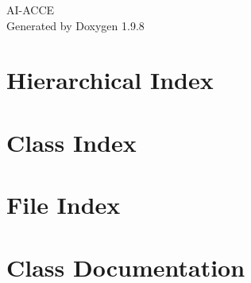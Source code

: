 \documentclass[twoside]{book}
\newcommand{\+}{\discretionary{\mbox{\scriptsize$\hookleftarrow$}}{}{}}
\newcommand{\clearemptydoublepage}{%
    \newpage{\pagestyle{empty}\cleardoublepage}%
  }
\begin{document}
  \raggedbottom
    \hypersetup{pageanchor=false,
                bookmarksnumbered=true,
                pdfencoding=unicode
               }
  \begin{titlepage}
  \vspace*{7cm}
  \begin{center}%
  {\Large AI-\/\+ACCE}\\
  \vspace*{1cm}
  {\large Generated by Doxygen 1.9.8}\\
  \end{center}
  \end{titlepage}
  \clearemptydoublepage
  \tableofcontents
  \clearemptydoublepage
  \hypersetup{pageanchor=true}

\chapter{Hierarchical Index}

\chapter{Class Index}

\chapter{File Index}

\chapter{Class Documentation}





































\end{document}
